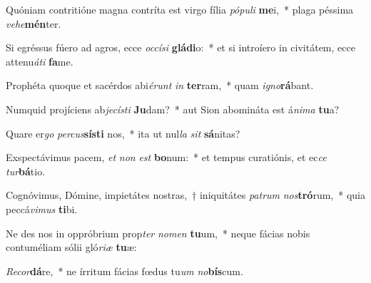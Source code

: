 \item Quóniam contritióne magna contríta est virgo fília \textit{pó}\textit{pu}\textit{li} \textbf{me}i,~* plaga péssima \textit{ve}\textit{he}\textbf{mén}ter.
\item Si egréssus fúero ad agros, ecce \textit{oc}\textit{cí}\textit{si} \textbf{glá}\textbf{di}o:~* et si introíero in civitátem, ecce attenu\textit{á}\textit{ti} \textbf{fa}me.
\item Prophéta quoque et sacérdos abi\textit{é}\textit{runt} \textit{in} \textbf{ter}ram,~* quam \textit{i}\textit{gno}\textbf{rá}bant.
\item Numquid projíciens ab\textit{je}\textit{cís}\textit{ti} \textbf{Ju}dam?~* aut Sion abomináta est á\textit{ni}\textit{ma} \textbf{tu}a?
\item Quare er\textit{go} \textit{per}\textit{cus}\textbf{sís}\textbf{ti} nos,~* ita ut nul\textit{la} \textit{sit} \textbf{sá}nitas?
\item Exspectávimus pacem, \textit{et} \textit{non} \textit{est} \textbf{bo}num:~* et tempus curatiónis, et ec\textit{ce} \textit{tur}\textbf{bá}tio.
\item Cognóvimus, Dómine, impietátes nostras,~† iniquitátes \textit{pa}\textit{trum} \textit{nos}\textbf{tró}rum,~* quia peccá\textit{vi}\textit{mus} \textbf{ti}bi.
\item Ne des nos in oppróbrium prop\textit{ter} \textit{no}\textit{men} \textbf{tu}um,~* neque fácias nobis contuméliam sólii gló\textit{ri}\textit{æ} \textbf{tu}æ:
\item \textit{Re}\textit{cor}\textbf{dá}re,~* ne írritum fácias fœdus tu\textit{um} \textit{no}\textbf{bís}cum.
